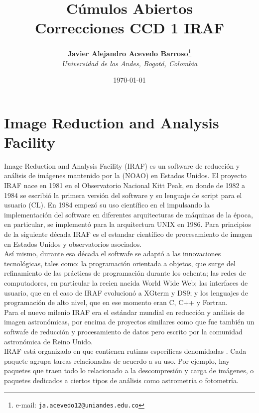 \documentclass[12pt]{article}
\begin{document}
\title{Cúmulos Abiertos \\ Correcciones CCD 1 IRAF}

\author{
\textbf{Javier Alejandro Acevedo Barroso\thanks{e-mail: \texttt{ja.acevedo12@uniandes.edu.co}}}\\
\textit{Universidad de los Andes, Bogotá, Colombia}\\
 }%

\date{\today}
\maketitle %


\normalsize
\newpage





\section{Image Reduction and Analysis Facility}
Image Reduction and Analysis Facility (IRAF) es un software de reducción y análisis de imágenes mantenido por la  (NOAO) en Estados Unidos. El proyecto IRAF nace en 1981 en el Observatorio Nacional Kitt Peak, en donde de 1982 a 1984 se escribió la primera versión del software y su lenguaje de script para el usuario  (CL). En 1984 empezó su uso científico en el  impulsando la implementación del software en diferentes arquitecturas de máquinas de la época, en particular, se implementó para la arquitectura UNIX en 1986. Para principios de la siguiente década IRAF es el estandar científico de procesamiento de imagen en Estados Unidos y observatorios asociados\cite{IRAFinThe80}. \\
Así mismo, durante esa década el softwafe se adaptó a las innovaciones tecnológicas, tales como: la programación orientada a objetos, que surge del refinamiento de las prácticas de programación durante los ochenta; las redes de computadores, en particular la recien nacida World Wide Web; las interfaces de usuario, que en el caso de IRAF evolucionó a XGterm y DS9; y los lenguajes de programación de alto nivel, que en ese momento eran C, C++ y Fortran\cite{IRAFinThe90}.\\
Para el nuevo milenio IRAF era el estándar mundial en reducción y análisis de imagen astronómicas, por encima de proyectos similares como  que fue también un softwafe de reducción y procesamiento de datos pero escrito por la comunidad astronómica de Reino Unido.\\
IRAF está organizado en  que contienen rutinas específicas denomidadas . Cada paquete agrupa tareas relacionadas de acuerdo a su uso. Por ejemplo, hay paquetes que traen todo lo relacionado a la descompresión y carga de imágenes, o paquetes dedicados a ciertos tipos de análisis como astrometría o fotometría.
\end{document}
